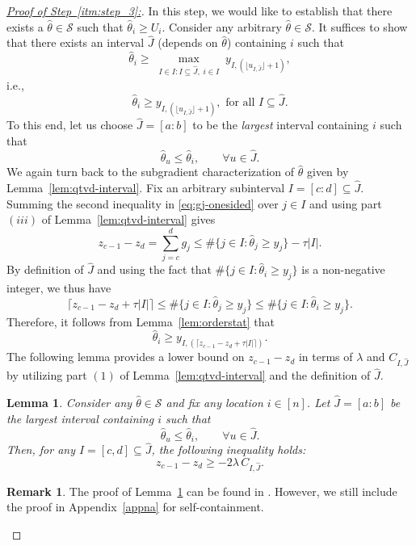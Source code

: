\documentclass[11pt]{article}
\newcommand{\cS}{\mathcal{S}}
\theoremstyle{plain}
\newtheorem{lemma}[theorem]{Lemma}
\theoremstyle{definition}
\newtheorem{remark}{Remark}
\theoremstyle{remark}
\begin{document}
\begin{proof}[\underline{Proof of Step~\ref{itm:step_3}:}]
In this step, we would like to establish that there exists a $\hat{\theta}\in \cS$ such that $\hat{\theta}_i\geq U_i$. Consider any arbitrary $\hat{\theta}\in \cS$. It suffices to show that there exists an interval $\hat{J}$ (depends on $\hat{\theta}$) containing $i$ such that
    \[\hat\theta_i\geq \max_{\substack{I\in I: I\subseteq \hat{J},\; i\in I}} y_{I,(\lfloor u_{I,\hat{J}}\rfloor+1)},\]
    i.e.,
    \begin{equation}\label{eqn:req_lower_bd_lower_bd}
       \hat\theta_i\geq  y_{I,(\lfloor u_{I,\hat{J}}\rfloor+1)},\text{ for all }I\subseteq \hat{J}. 
    \end{equation}
    To this end, let us choose $\hat{J}=[a:b]$ to be the \emph{largest} interval containing $i$ such that
\[
\hat\theta_u\le \hat\theta_i,\qquad \forall u\in \hat{J}.
\]
We again turn back to the subgradient characterization of $\hat{\theta}$ given by Lemma~\ref{lem:qtvd-interval}. Fix an arbitrary subinterval $I=[c:d]\subseteq \hat{J}$. Summing the second inequality in \eqref{eq:gj-onesided} over $j\in I$ and using part $(iii)$ of Lemma~\ref{lem:qtvd-interval} gives
\begin{equation*}
z_{c-1}-z_d=\sum_{j=c}^d g_j \le \#\{j\in I:\hat\theta_j\ge y_j\}-\tau|I|.
\end{equation*}
By definition of $\hat{J}$ and using the fact that $\#\{j\in I:\hat\theta_i\ge y_j\}$ is a non-negative integer, we thus have
\begin{equation}
    \lceil z_{c-1}-z_d+\tau |I|\rceil  \le \#\{j\in I:\hat\theta_j\ge y_j\}\le \#\{j\in I:\hat\theta_i\ge y_j\}.
\end{equation}
Therefore, it follows from Lemma~\ref{lem:orderstat} that
\begin{equation}\label{eq:count-lower-start}
    \hat{\theta}_i\geq y_{I,(\lceil z_{c-1}-z_d+\tau |I|\rceil)}.
\end{equation}
The following lemma provides a lower bound on $z_{c-1}-z_d$ in terms of $\lambda$ and $C_{I,\hat{J}}$ by utilizing part $(1)$ of Lemma~\ref{lem:qtvd-interval} and the definition of $\hat{J}$.
\begin{lemma}\label{lemma:z_lower_bd}
    Consider any $\hat{\theta}\in \cS$ and fix any location $i \in [n]$. Let $\hat{J}=[a:b]$ be the \emph{largest} interval containing $i$ such that
\[
\hat\theta_u\le \hat\theta_i,\qquad \forall u\in \hat{J}.
\]
Then, for any $I=[c,d]\subseteq \hat{J}$, the following inequality holds: 
\begin{equation}\label{eq:z-lower-key-thm2}
z_{c-1}-z_d \ge -2\lambda\,C_{I,\hat{J}}.
\end{equation}
\end{lemma}
    \begin{remark}
    The proof of Lemma~\ref{lemma:z_lower_bd} can be found in \cite{chatterjee2026minmaxtrendfilteringgeneralizations}. However, we still include the proof in Appendix~\ref{appna} for self-containment. 
\end{remark}


\end{proof}
\end{document}

